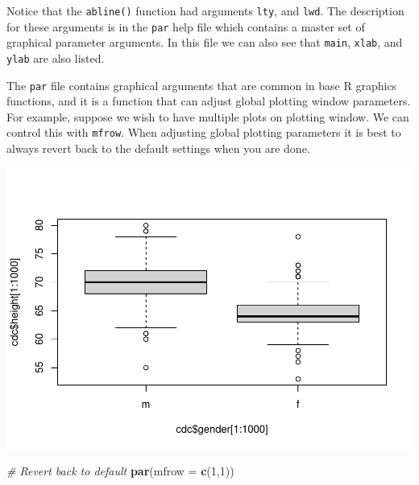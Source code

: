 \documentclass[
]{book}
\newenvironment{Shaded}{\begin{snugshade}}{\end{snugshade}}
\newcommand{\CommentTok}[1]{\textcolor[rgb]{0.56,0.35,0.01}{\textit{#1}}}
\newcommand{\DataTypeTok}[1]{\textcolor[rgb]{0.13,0.29,0.53}{#1}}
\newcommand{\DecValTok}[1]{\textcolor[rgb]{0.00,0.00,0.81}{#1}}
\newcommand{\KeywordTok}[1]{\textcolor[rgb]{0.13,0.29,0.53}{\textbf{#1}}}
\newcommand{\NormalTok}[1]{#1}
\newcommand{\OperatorTok}[1]{\textcolor[rgb]{0.81,0.36,0.00}{\textbf{#1}}}
\begin{document}
Notice that the \texttt{abline()} function had arguments \texttt{lty}, and \texttt{lwd}. The description for these arguments is in the \texttt{par} help file which contains a master set of graphical parameter arguments. In this file we can also see that \texttt{main}, \texttt{xlab}, and \texttt{ylab} are also listed.

The \texttt{par} file contains graphical arguments that are common in base R graphics functions, and it is a function that can adjust global plotting window parameters. For example, suppose we wish to have multiple plots on plotting window. We can control this with \texttt{mfrow}. When adjusting global plotting parameters it is best to always revert back to the default settings when you are done.

\begin{Shaded}
\end{Shaded}

\includegraphics{_main_files/figure-latex/unnamed-chunk-134-1.pdf}

\begin{Shaded}
\begin{Highlighting}[]
\CommentTok{# Revert back to default }
\KeywordTok{par}\NormalTok{(}\DataTypeTok{mfrow =} \KeywordTok{c}\NormalTok{(}\DecValTok{1}\NormalTok{,}\DecValTok{1}\NormalTok{))}
\end{Highlighting}
\end{Shaded}
\end{document}

